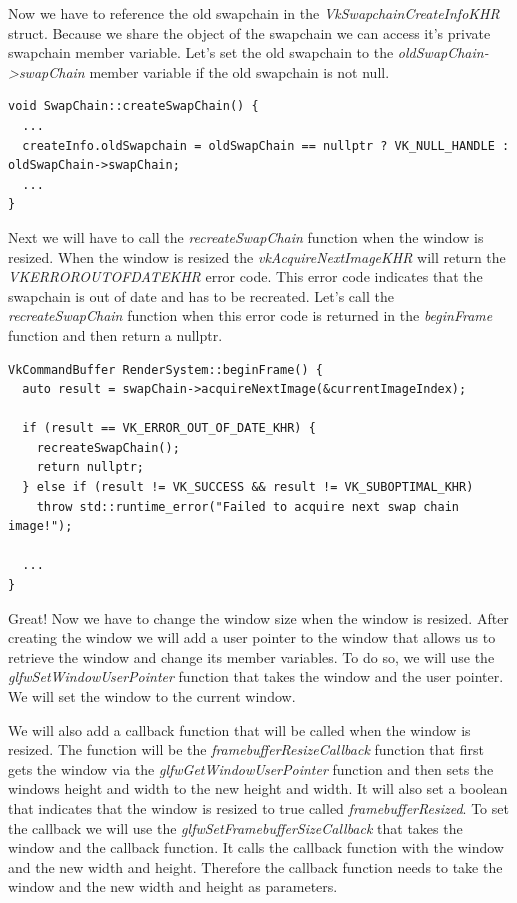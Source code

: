 \documentclass[12pt]{report} \usepackage{preamble}
\begin{document}
Now we have to reference the old swapchain in the \textit{VkSwapchainCreateInfoKHR} struct. Because we share the object of the swapchain we can access it's
private swapchain member variable. Let's set the old swapchain to the \textit{oldSwapChain->swapChain} member variable if the old swapchain is not null.

\begin{lstlisting}[Language=C++]
void SwapChain::createSwapChain() {
  ...
  createInfo.oldSwapchain = oldSwapChain == nullptr ? VK_NULL_HANDLE : oldSwapChain->swapChain;
  ...
}
\end{lstlisting}

Next we will have to call the \textit{recreateSwapChain} function when the window is resized. When the window is resized the \textit{vkAcquireNextImageKHR}
will return the \\ \textit{VK\textunderscore ERROR\textunderscore OUT\textunderscore OF\textunderscore DATE\textunderscore KHR} error code. This error code
indicates that the swapchain is out of date and has to be recreated. Let's call the \textit{recreateSwapChain} function when this error code is returned
in the \textit{beginFrame} function and then return a nullptr.

\begin{lstlisting}[Language=C++]
VkCommandBuffer RenderSystem::beginFrame() {
  auto result = swapChain->acquireNextImage(&currentImageIndex);

  if (result == VK_ERROR_OUT_OF_DATE_KHR) {
    recreateSwapChain();
    return nullptr;
  } else if (result != VK_SUCCESS && result != VK_SUBOPTIMAL_KHR)
    throw std::runtime_error("Failed to acquire next swap chain image!");

  ...
}
\end{lstlisting}

Great! Now we have to change the window size when the window is resized. After creating the window we will add a user pointer to the window that
allows us to retrieve the window and change its member variables. To do so, we will use the \textit{glfwSetWindowUserPointer} function that takes the window
and the user pointer. We will set the window to the current window.

We will also add a callback function that will be called when the window is resized.
The function will be the \textit{framebufferResizeCallback} function that first gets the window via the \textit{glfwGetWindowUserPointer} function and then
sets the windows height and width to the new height and width.
It will also set a boolean that indicates that the window is resized to true called \textit{framebufferResized}.
To set the callback we will use the \textit{glfwSetFramebufferSizeCallback}
that takes the window and the callback function. It calls the callback function with the window and the new width and height. Therefore the callback function
needs to take the window and the new width and height as parameters.
\end{document}
